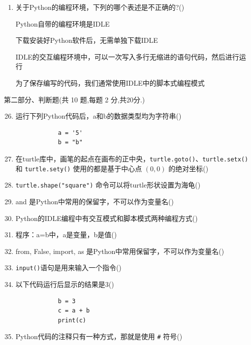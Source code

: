 \documentclass[11pt]{ctexart}
\begin{document}
\begin{enumerate}
        \item 关于Python的编程环境，下列的哪个表述是不正确的?(\qquad)
        \begin{tasks}
            \task Python自带的编程环境是IDLE

            \task 下载安装好Python软件后，无需单独下载IDLE

            \task IDLE的交互编程环境中，可以一次写入多行无缩进的语句代码，然后进行运行 

            \task 为了保存编写的代码，我们通常使用IDLE中的脚本式编程模式 
        \end{tasks}
    \end{enumerate}

    {\noindent\heiti 第二部分、判断题(共 10 题,每题 2 分,共20分.)}
    \begin{enumerate}
        \setcounter{enumi}{25}
        \item 运行下列Python代码后，a和b的数据类型均为字符串(\qquad)
        \begin{lstlisting}
            a = '5'
            b = "b"
        \end{lstlisting}

        \item 在turtle库中，画笔的起点在画布的正中央，\lstinline{turtle.goto()}、\lstinline{turtle.setx()} 和 \lstinline{turtle.sety()} 使用的都是基于中心点 $(0,0)$ 的绝对坐标(\qquad)
        
        \item \lstinline{turtle.shape("square")} 命令可以将turtle形状设置为海龟(\qquad)
  
        \item and 是Python中常用的保留字，不可以作为变量名(\qquad)
        
        \item Python的IDLE编程中有交互模式和脚本模式两种编程方式(\qquad)
        
        \item 程序：a=b中，a是变量，b是值(\qquad)
        
        \item from, False, import, as 是Python中常用保留字，不可以作为变量名(\qquad)
        
        \item \lstinline!input()!语句是用来输入一个指令(\qquad)
        
        \item 以下代码运行后显示的结果是3(\qquad)
        \begin{lstlisting}
            b = 3
            c = a + b
            print(c)
        \end{lstlisting}
        
        \item Python代码的注释只有一种方式，那就是使用 \lstinline{#} 符号(\qquad)
    \end{enumerate}
\end{document}
